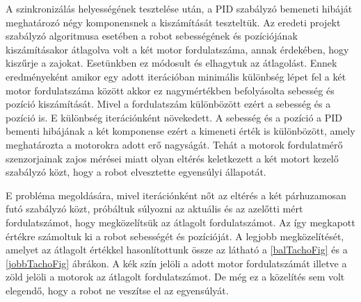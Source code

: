 A szinkronizálás helyességének tesztelése után, a PID szabályzó bemeneti hibáját meghatározó négy komponensnek a kiszámítását teszteltük. Az eredeti projekt szabályzó algoritmusa esetében a robot sebességének és pozíciójának kiszámításakor átlagolva volt a két motor fordulatszáma, annak érdekében, hogy kiszűrje a zajokat. Esetünkben ez módosult és elhagytuk az átlagolást. Ennek eredményeként amikor egy adott iterációban minimális különbség lépet fel a két motor fordulatszáma között akkor ez nagymértékben befolyásolta sebesség és pozíció kiszámítását. Mivel a fordulatszám különbözött ezért a sebesség és a pozíció is. E különbség iterációnként növekedett. A sebesség és a pozíció a PID bementi hibájának a két komponense ezért a kimeneti érték is különbözött, amely meghatározta a motorokra adott erő nagyságát. Tehát a motorok fordulatmérő szenzorjainak zajos mérései miatt olyan eltérés keletkezett a két motort kezelő szabályzó közt, hogy a robot elvesztette egyensúlyi állapotát.

E probléma megoldására, mivel iterációnként nőt az eltérés a két párhuzamosan futó szabályzó közt, próbáltuk súlyozni az aktuális és az azelőtti mért fordulatszámot, hogy megközelítsük az átlagolt fordulatszámot. Az így megkapott értékre számoltuk ki a robot sebességét és pozícióját. A legjobb megközelítését, amelyet az átlagolt értékkel hasonlítottunk össze az látható a \ref{balTachoFig} és a \ref{jobbTachoFig} ábrákon. A kék szín jelöli a adott motor fordulatszámát illetve a zöld jelöli a motorok az átlagolt fordulatszámot. De még ez a közelítés sem volt elegendő, hogy a robot ne veszítse el az egyensúlyát.

